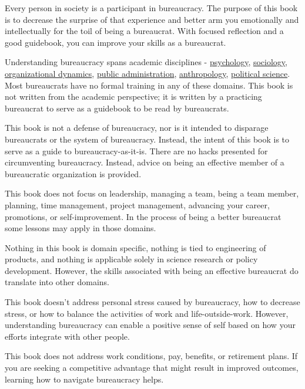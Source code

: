 Every person in society is a participant in bureaucracy. The purpose of this book is to decrease the surprise of that experience and better arm you emotionally and intellectually for the toil of being a bureaucrat. With focused reflection and a good guidebook, you can improve your skills as a bureaucrat. 

Understanding bureaucracy spans academic disciplines - \href{https://en.wikipedia.org/wiki/Psychology}{psychology}, \href{https://en.wikipedia.org/wiki/Sociology}{sociology}, \href{https://en.wikipedia.org/wiki/Organizational_behavior}{organizational dynamics}, \href{https://en.wikipedia.org/wiki/Public_administration}{public administration}, \href{https://en.wikipedia.org/wiki/Anthropology}{anthropology}, \href{https://en.wikipedia.org/wiki/Political_science}{political science}. Most bureaucrats have no formal training in any of these domains. This book is not written from the academic perspective; it is written by a practicing bureaucrat to serve as a guidebook to be read by bureaucrats. 

This book is not a defense of bureaucracy, nor is it intended to disparage bureaucrats or the system of bureaucracy. Instead, the intent of this book is to serve as a guide to bureaucracy-as-it-is. There are no hacks presented for circumventing bureaucracy. Instead, advice on being an effective member of a bureaucratic organization is provided.

This book does not focus on leadership, managing a team, being a team member, planning, time management, project management, advancing your career, promotions, or self-improvement. In the process of being a better bureaucrat some lessons may apply in those domains.


Nothing in this book is domain specific, nothing is tied to engineering of products, and nothing is applicable solely in science research or policy development. However, the skills associated with being an effective bureaucrat do translate into other domains.

This book doesn't address personal stress caused by bureaucracy, how to decrease stress, or how to balance the activities of work and life-outside-work.   However, understanding bureaucracy can enable a positive sense of self based on how your efforts integrate with other people. 

This book does not address work conditions, pay, benefits, or retirement plans. If you are seeking a competitive advantage that might result in improved outcomes, learning how to navigate bureaucracy helps.


